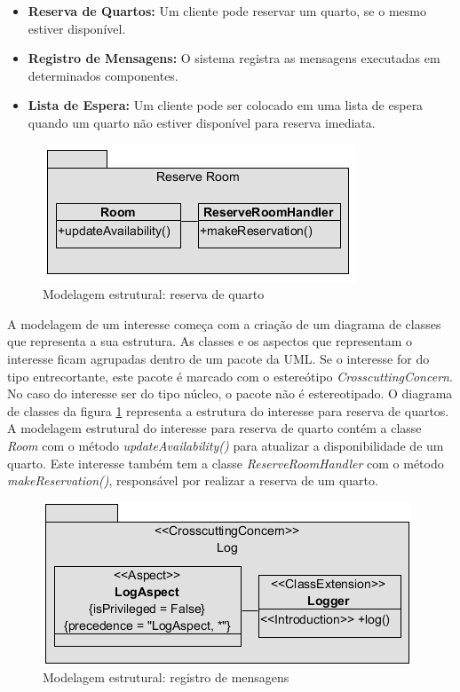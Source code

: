 \begin{itemize}
  \item \textbf{Reserva de Quartos:} Um cliente pode reservar um quarto, se o mesmo estiver disponível.
  \item \textbf{Registro de Mensagens:} O sistema registra as mensagens executadas em determinados componentes.
  \item \textbf{Lista de Espera:} Um cliente pode ser colocado em uma lista de espera quando um quarto não estiver disponível para reserva imediata.
\end{itemize}

  \begin{figure}[!h]
	\centering
	\includegraphics{img/case_study_structural_reserve_room.png}
	\caption{Modelagem estrutural: reserva de quarto}\label{fig:case_study_structural_reserve_room}
  \end{figure}

A modelagem de um interesse começa com a criação de um diagrama de classes que representa a sua estrutura. As classes e os aspectos que
representam o interesse ficam agrupadas dentro de um pacote da UML. Se o interesse for do tipo entrecortante, este pacote é marcado com o estereótipo
\textit{CrosscuttingConcern}. No caso do interesse ser do tipo núcleo, o pacote não é estereotipado. O diagrama de classes da figura
\ref{fig:case_study_structural_reserve_room} representa a estrutura do interesse para reserva de quartos. A modelagem estrutural do interesse para 
reserva de quarto contém a classe \textit{Room} com o método \textit{updateAvailability()} para atualizar a disponibilidade de um quarto. Este
interesse também tem a classe \textit{ReserveRoomHandler} com o método \textit{makeReservation()}, responsável por realizar a reserva de um quarto.

  \begin{figure}[!h]
	\centering
	\includegraphics{img/case_study_structural_log.png}
	\caption{Modelagem estrutural: registro de mensagens}\label{fig:case_study_structural_log}
  \end{figure}


